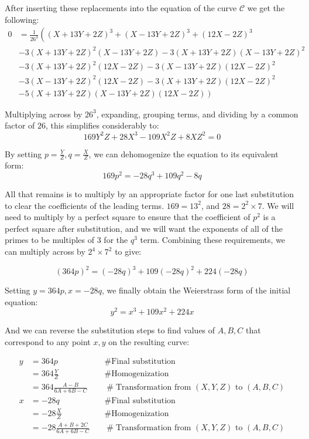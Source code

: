 \documentclass{article}
\begin{document}
After inserting these replacements into the equation of the curve $\mathcal{C}$ we get the following:
\begin{equation*}
	\begin{split}
		0 & =  \frac{1}{26^3}\left( (X+13Y+2Z)^3 + (X-13Y+2Z)^3 + (12X-2Z)^3  \right. \\
	          & - 3(X+13Y+2Z)^2(X-13Y+2Z) - 3(X+13Y+2Z)(X-13Y+2Z)^2 \\
		  & - 3(X+13Y+2Z)^2(12X-2Z) - 3(X-13Y+2Z)(12X-2Z)^2 \\
	          & - 3(X-13Y+2Z)^2(12X-2Z) - 3(X+13Y+2Z)(12X-2Z)^2 \\
	          & \left. - 5(X+13Y+2Z)(X-13Y+2Z)(12X-2Z) \right)
	\end{split}
\end{equation*}

Multiplying across by $26^3$, expanding, grouping terms, and dividing by a common factor of $26$, this
simplifies considerably to:
\[ 169Y^2Z + 28X^3 - 109 X^2Z + 8XZ^2 = 0 \]

By setting $p=\frac{Y}{Z}, q=\frac{X}{Z}$, we can dehomogenize the equation to its equivalent form:
\[ 169p^2 = -28q^3 + 109q^2 -8q \]

All that remains is to multiply by an appropriate factor for one last substitution to clear the
coefficients of the leading terms. $169=13^2$, and $28=2^2\times7$. We will need to multiply by
a perfect square to ensure that the coefficient of $p^2$ is a perfect square after substitution,
and we will want the exponents of all of the primes to be multiples of 3 for the $q^3$ term.
Combining these requirements, we can multiply across by $2^4\times7^2$ to give:

\[ (364p)^2 = (-28 q)^3 + 109(-28q)^2 + 224(-28q) \]

Setting $y = 364p, x = -28q$, we finally obtain the Weierstrass form of the initial equation:
\[ y^2 = x^3 + 109x^2 +224x \]

And we can reverse the substitution steps to find values of $A, B, C$ that correspond to any point
$x,y$ on the resulting curve:

\begin{equation*}
	\begin{array}{lllll}
		y &= 364p & \quad \mathrel{\#} \text{Final substitution} \\
		 &= 364\frac{Y}{Z} & \quad \mathrel{\#} \text{Homogenization} \\
		 &= 364\frac{A - B}{6A + 6B - C} & \quad \mathrel{\#} \text{Transformation from $(X,Y,Z)$ to $(A,B,C)$} \\
		x &= -28q & \quad \mathrel{\#} \text{Final substitution} \\
		 &= -28\frac{X}{Z} & \quad \mathrel{\#} \text{Homogenization} \\
		 &= -28\frac{A + B +2C}{6A + 6B - C} & \quad \mathrel{\#} \text{Transformation from $(X,Y,Z)$ to $(A,B,C)$} \\
	\end{array}
\end{equation*}
\end{document}
